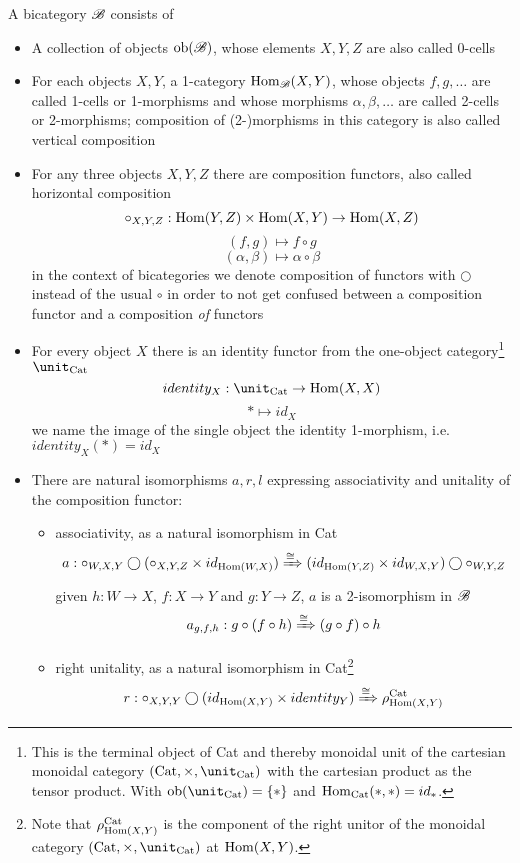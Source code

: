 \begin{defn}[Bicategory]\label{Bicategory}
    A bicategory $\mathscr{B}$ consists of \begin{itemize}
        \item A collection of objects $\operatorname{ob}(\mathscr{B})$, whose elements $X,Y,Z$ are also called 0-cells
        \item For each objects $X,Y$, a 1-category $\operatorname{Hom}_{\mathscr{B}}(X,Y)$, whose objects $f,g,\dots$ are called 1-cells or 1-morphisms and whose morphisms $\alpha,\beta,\dots$ are called 2-cells or 2-morphisms; composition of (2-)morphisms in this category is also called vertical composition
        \item For any three objects $X,Y,Z$ there are composition functors, also called horizontal composition $$\circ_{X,Y,Z}:\operatorname{Hom}(Y,Z)\times \operatorname{Hom}(X,Y)\to \operatorname{Hom}(X,Z)$$
        $$(f,g)\mapsto f\circ g$$
        $$(\alpha,\beta)\mapsto \alpha\circ\beta$$ in the context of bicategories we denote composition of functors with $\bigcirc$ instead of the usual $\circ$ in order to not get confused between a composition functor and a composition \emph{of} functors
        \item  For every object $X$ there is an identity functor from the one-object category\footnote{This is the terminal object of Cat and thereby monoidal unit of the cartesian monoidal category $(\Cat,\times,\unit_{\Cat})$ with the cartesian product as the tensor product. With $\ob(\unit_{\Cat})=\{\ast\}$ and $\operatorname{Hom}_{\operatorname{Cat}}(\ast,\ast)=id_{\ast}$.} $\unit_{\Cat}$
        $$identity_X:\unit_{\text{Cat}}\to \Hom(X,X)$$ $$\ast\mapsto id_X$$ we name the image of the single object the identity 1-morphism, i.e. $identity_{X}(\ast)=id_X$
        \item There are natural isomorphisms $a,r,l$ expressing associativity and unitality of the composition functor: \begin{itemize}
            \item associativity, as a natural isomorphism in Cat $$a:\circ_{W,X,Y}\bigcirc(\circ_{X,Y,Z}\times id_{\operatorname{Hom}(W,X)})\xRightarrow{\cong}(id_{\operatorname{Hom}(Y,Z)}\times id_{W,X,Y})\bigcirc \circ_{W,Y,Z}$$
            given $h:W\to X$, $f:X\to Y$ and $g:Y\to Z$, $a$ is a 2-isomorphism in $\mathscr{B}$
            $$a_{g,f,h}:g\circ(f\circ h)\xRightarrow{\cong} (g\circ f)\circ h$$
            \item right unitality, as a natural isomorphism in Cat\footnote{Note that $\rho^{\operatorname{Cat}}_{\operatorname{Hom}(X,Y)}$ is the component of the right unitor of the monoidal category $(\Cat,\times,\unit_{\Cat})$ at $\operatorname{Hom}(X,Y)$.} $$r:\circ_{X,Y,Y}\bigcirc(id_{\operatorname{Hom}(X,Y)}\times identity_Y)\xRightarrow{\cong}\rho^{\operatorname{Cat}}_{\operatorname{Hom}(X,Y)}$$

\end{itemize}
\end{itemize}
\end{defn}

